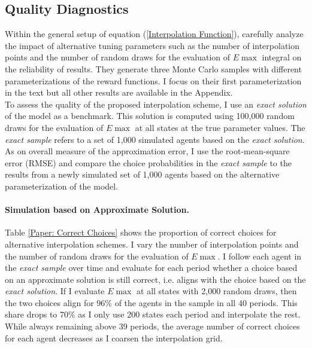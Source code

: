 \subsection{Quality Diagnostics}
Within the general setup of equation (\ref{Interpolation Function}), \citet{Keane.1994} carefully analyze the impact of alternative tuning parameters such as the number of interpolation points and the number of random draws for the evaluation of $E\max$ integral on the reliability of results. They generate three Monte Carlo samples with different parameterizations of the reward functions. I focus on their first parameterization in the text but all other results are available in the Appendix.\\\newline
%
To assess the quality of the proposed interpolation scheme, I use an \textit{exact solution} of the model as a benchmark. This solution is computed using 100,000 random draws for the evaluation of $E\max$ at all states at the true parameter values. The \textit{exact sample} refers to a set of 1,000 simulated agents based on the \textit{exact solution}. As on overall measure of the approximation error, I use the root-mean-square error (RMSE) and compare the choice probabilities in the \textit{exact sample} to the results from a newly simulated set of 1,000 agents based on the alternative parameterization of the model.
\paragraph{Simulation based on Approximate Solution.}
Table \ref{Paper: Correct Choices} shows the proportion of correct choices for alternative interpolation schemes. I vary the number of interpolation points and the number of random draws for the evaluation of $E\max$. I follow each agent in the \textit{exact sample} over time and evaluate for each period whether a choice based on an approximate solution is still correct, i.e. aligns with the choice based on the \textit{exact solution}. If I evaluate $E\max$ at all states with 2,000 random draws, then the two choices align for 96\% of the agents in the sample in all 40 periods. This share drops to 70\% as I only use 200 states each period and interpolate the rest. While always remaining above 39 periods, the average number of correct choices for each agent decreases as I coarsen the interpolation grid.

